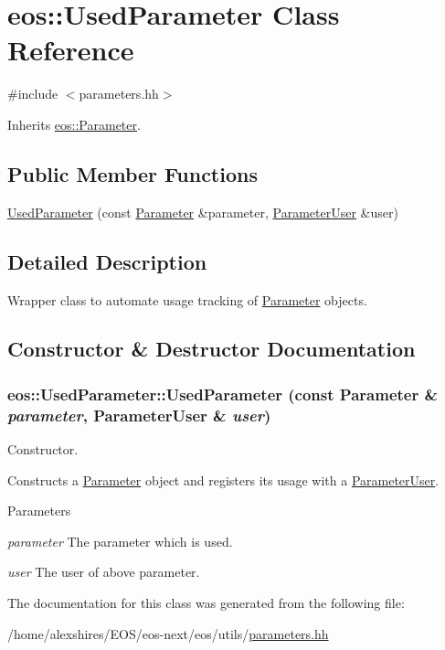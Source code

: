 \hypertarget{classeos_1_1UsedParameter}{
\section{eos::UsedParameter Class Reference}
\label{classeos_1_1UsedParameter}
}


{\ttfamily \#include $<$parameters.hh$>$}

Inherits \hyperlink{classeos_1_1Parameter}{eos::Parameter}.\subsection*{Public Member Functions}
\begin{DoxyCompactItemize}
\item 
\hyperlink{classeos_1_1UsedParameter_a3c995a62b3f94be0e1c02edc9c670e03}{UsedParameter} (const \hyperlink{classeos_1_1Parameter}{Parameter} \&parameter, \hyperlink{classeos_1_1ParameterUser}{ParameterUser} \&user)
\end{DoxyCompactItemize}


\subsection{Detailed Description}
Wrapper class to automate usage tracking of \hyperlink{classeos_1_1Parameter}{Parameter} objects. 

\subsection{Constructor \& Destructor Documentation}
\hypertarget{classeos_1_1UsedParameter_a3c995a62b3f94be0e1c02edc9c670e03}{
\subsubsection[{UsedParameter}]{\setlength{\rightskip}{0pt plus 5cm}eos::UsedParameter::UsedParameter (const {\bf Parameter} \& {\em parameter}, \/  {\bf ParameterUser} \& {\em user})}}
\label{classeos_1_1UsedParameter_a3c995a62b3f94be0e1c02edc9c670e03}
Constructor.

Constructs a \hyperlink{classeos_1_1Parameter}{Parameter} object and registers its usage with a \hyperlink{classeos_1_1ParameterUser}{ParameterUser}.


\begin{DoxyParams}{Parameters}
\item[{\em parameter}]The parameter which is used. \item[{\em user}]The user of above parameter. \end{DoxyParams}


The documentation for this class was generated from the following file:\begin{DoxyCompactItemize}
\item 
/home/alexshires/EOS/eos-\/next/eos/utils/\hyperlink{parameters_8hh}{parameters.hh}\end{DoxyCompactItemize}
